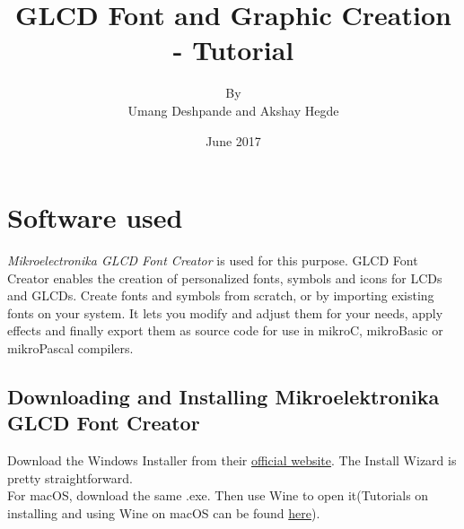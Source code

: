 \documentclass{article}
\title{GLCD Font and Graphic Creation - Tutorial}
\author{By \\ Umang Deshpande and Akshay Hegde}
\date{June 2017}
\begin{document}
\maketitle

\section{Software used}
\qquad \textit{Mikroelectronika GLCD Font Creator} is used for this purpose. GLCD Font Creator enables the creation of personalized fonts, symbols and icons for LCDs and GLCDs. Create fonts and symbols from scratch, or by importing existing fonts on your system. It lets you modify and adjust them for your needs, apply effects and finally export them as source code for use in mikroC, mikroBasic or mikroPascal compilers.

\subsection{Downloading and Installing Mikroelektronika GLCD Font Creator}
Download the Windows Installer from their \href{https://download.mikroe.com/setups/additional-software/glcd-font-creator/glcd-font-creator-v120.zip}{official website}. The Install Wizard is pretty straightforward. \\
For macOS, download the same .exe. Then use Wine to open it(Tutorials on installing and using Wine on macOS can be found \href{https://www.davidbaumgold.com/tutorials/wine-mac/}{here}). 
\end{document}
